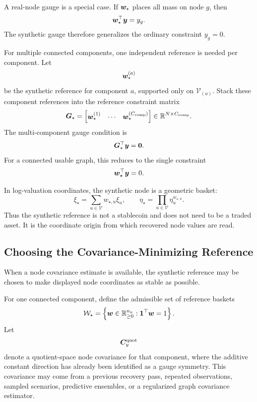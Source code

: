 A real-node gauge is a special case.  If $\bm{w}_{\star}$ places all mass on
node $g$, then
\[
  \bm{w}_{\star}^{\top}\bm{y}
  =
  y_g.
\]
The synthetic gauge therefore generalizes the ordinary constraint $y_g=0$.

For multiple connected components, one independent reference is needed per
component.  Let
\[
  \bm{w}_{\star}^{(a)}
\]
be the synthetic reference for component $a$, supported only on
$\mathcal{V}_{(a)}$.  Stack these component references into the reference
constraint matrix
\[
  \bm{G}_{\star}
  =
  \begin{bmatrix}
    \bm{w}_{\star}^{(1)}
    &
    \cdots
    &
    \bm{w}_{\star}^{(C_{\mathrm{comp}})}
  \end{bmatrix}
  \in
  \mathbb{R}^{N\times C_{\mathrm{comp}}}.
\]
The multi-component gauge condition is
\[
  \bm{G}_{\star}^{\top}\bm{y}
  =
  \bm{0}.
\]
For a connected usable graph, this reduces to the single constraint
\[
  \bm{w}_{\star}^{\top}\bm{y}=0.
\]

In log-valuation coordinates, the synthetic node is a geometric basket:
\[
  \xi_{\star}
  =
  \sum_{u\in\mathcal{V}}
  w_{\star,u}\xi_u,
  \qquad
  \eta_{\star}
  =
  \prod_{u\in\mathcal{V}}
  \eta_u^{w_{\star,u}}.
\]
Thus the synthetic reference is not a stablecoin and does not need to be a
traded asset.  It is the coordinate origin from which recovered node values are
read.


\subsection{Choosing the Covariance-Minimizing Reference}
\label{subsec:choosing-covariance-minimizing-reference}

When a node covariance estimate is available, the synthetic reference may be
chosen to make displayed node coordinates as stable as possible.

For one connected component, define the admissible set of reference baskets
\[
  \mathcal{W}_{\star}
  =
  \left\{
    \bm{w}\in\mathbb{R}_{\ge 0}^{n_a}:
    \mathbf{1}^{\top}\bm{w}=1
  \right\}.
\]
Let
\[
  \bm{C}_{y}^{\mathrm{quot}}
\]
denote a quotient-space node covariance for that component, where the additive
constant direction has already been identified as a gauge symmetry.  This
covariance may come from a previous recovery pass, repeated observations,
sampled scenarios, predictive ensembles, or a regularized graph covariance
estimator.

